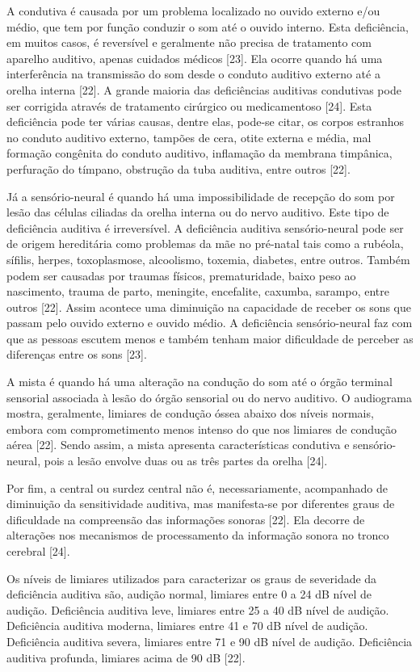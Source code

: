 \documentclass[a4paper]{article}
\begin{document}
\begin{titlepage}
A condutiva é causada por um problema localizado no ouvido externo e/ou médio, que tem por função conduzir o som até o ouvido interno. Esta deficiência, em muitos casos, é reversível e geralmente não precisa de tratamento com aparelho auditivo, apenas cuidados médicos [23]. Ela ocorre quando há uma interferência na transmissão do som desde o conduto auditivo externo até a orelha interna [22]. A grande maioria das deficiências auditivas condutivas pode ser corrigida através de tratamento cirúrgico ou medicamentoso [24]. Esta deficiência pode ter várias causas, dentre elas, pode-se citar, os corpos estranhos no conduto auditivo externo, tampões de cera, otite externa e média, mal formação congênita do conduto auditivo, inflamação da membrana timpânica, perfuração do tímpano, obstrução da tuba auditiva, entre outros [22].

Já a sensório-neural é quando há uma impossibilidade de recepção do som por lesão das células ciliadas da orelha interna ou do nervo auditivo. Este tipo de deficiência auditiva é irreversível. A deficiência auditiva sensório-neural pode ser de origem hereditária como problemas da mãe no pré-natal tais como a rubéola, sífilis, herpes, toxoplasmose, alcoolismo, toxemia, diabetes, entre outros. Também podem ser causadas por traumas físicos, prematuridade, baixo peso ao nascimento, trauma de parto, meningite, encefalite, caxumba, sarampo, entre outros [22]. Assim acontece uma diminuição na capacidade de receber os sons que passam pelo ouvido externo e ouvido médio. A deficiência sensório-neural faz com que as pessoas escutem menos e também tenham maior dificuldade de perceber as diferenças entre os sons [23].

A mista é quando há uma alteração na condução do som até o órgão terminal sensorial associada à lesão do órgão sensorial ou do nervo auditivo. O audiograma mostra, geralmente, limiares de condução óssea abaixo dos níveis normais, embora com comprometimento menos intenso do que nos limiares de condução aérea [22]. Sendo assim, a mista apresenta características condutiva e sensório-neural, pois a lesão envolve duas ou as três partes da orelha [24].

Por fim, a central ou surdez central não é, necessariamente, acompanhado de diminuição da sensitividade auditiva, mas manifesta-se por diferentes graus de dificuldade na compreensão das informações sonoras [22]. Ela decorre de alterações nos mecanismos de processamento da informação sonora no tronco cerebral [24].

Os níveis de limiares utilizados para caracterizar os graus de severidade da deficiência auditiva são, audição normal, limiares entre 0 a 24 dB nível de audição. Deficiência auditiva leve, limiares entre 25 a 40 dB nível de audição. Deficiência auditiva moderna, limiares entre 41 e 70 dB nível de audição. Deficiência auditiva severa, limiares entre 71 e 90 dB nível de audição. Deficiência auditiva profunda, limiares acima de 90 dB [22].


\end{titlepage}
\end{document}
